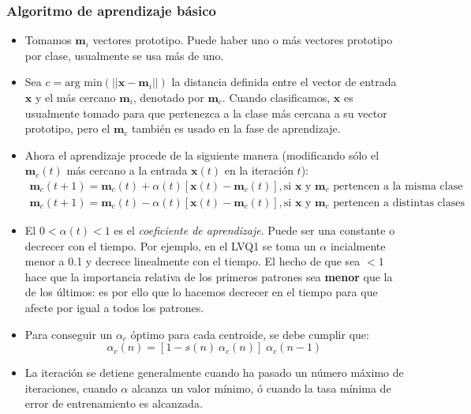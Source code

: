 \documentclass[10pt,a4paper]{article}
\begin{document}
\subsubsection{Algoritmo de aprendizaje básico}
\begin{itemize}
\item Tomamos $\mathbf{m}_i$ vectores prototipo. Puede haber uno o más vectores prototipo por clase, usualmente se usa más de uno.
\item Sea $c = \text{arg min}(||\mathbf{x} - \mathbf{m}_i||)$ la distancia definida entre el vector de entrada $\mathbf{x}$ y el más cercano $\mathbf{m}_i$, denotado por $\mathbf{m}_c$. Cuando clasificamos, $\mathbf{x}$ es usualmente tomado para que pertenezca a la clase más cercana a su vector prototipo, pero el $\mathbf{m}_c$ también es usado en la fase de aprendizaje.
\item Ahora el aprendizaje procede de la siguiente manera (modificando sólo el $\mathbf{m}_c(t)$ más cercano a la entrada $\mathbf{x}(t)$ en la iteración $t$):
\begin{align*}
\mathbf{m}_c(t+1) = \mathbf{m}_c(t) + \alpha(t)[\mathbf{x}(t) - \mathbf{m}_c(t)], \text{si $\mathbf{x}$ y $\mathbf{m}_c$ pertencen a la misma clase} \\
\mathbf{m}_c(t+1) = \mathbf{m}_c(t) - \alpha(t)[\mathbf{x}(t) - \mathbf{m}_c(t)], \text{si $\mathbf{x}$ y $\mathbf{m}_c$ pertencen a distintas clases} 
\end{align*}
\item El $0<\alpha(t)<1$ es el \textit{coeficiente de aprendizaje}. Puede ser una constante o decrecer con el tiempo. Por ejemplo, en el LVQ1 se toma un $\alpha$ incialmente menor a 0.1 y decrece linealmente con el tiempo. El hecho de que sea  $<1$ hace que la importancia relativa de los primeros patrones sea \textbf{menor} que la de los últimos: es por ello que lo hacemos decrecer en el tiempo para que afecte por igual a todos los patrones.
\item Para conseguir un $\alpha_c$ óptimo para cada centroide, se debe cumplir que:
\[\alpha_c (n) = [1 - s(n)\: \alpha_c(n)] \; \alpha_c(n-1)\]
\item La iteración se detiene generalmente cuando ha pasado un número máximo de iteraciones, cuando $\alpha$ alcanza un valor mínimo, ó cuando la tasa mínima de error de entrenamiento es alcanzada.
\end{itemize}
\end{document}
